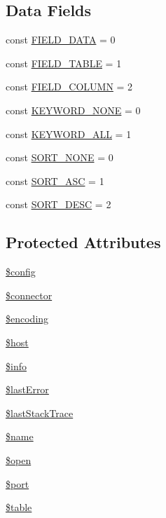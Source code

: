 \subsection*{Data Fields}
\begin{DoxyCompactItemize}
\item 
const \hyperlink{class_my_s_q_l_database_ac3188f4350978425c488580c5cea8468}{F\+I\+E\+L\+D\+\_\+\+D\+A\+T\+A} = 0
\item 
const \hyperlink{class_my_s_q_l_database_acbdf154a35cfc228dd1016e8aa4bd503}{F\+I\+E\+L\+D\+\_\+\+T\+A\+B\+L\+E} = 1
\item 
const \hyperlink{class_my_s_q_l_database_a87aad3e89cc6a17f293cf5410b225bbe}{F\+I\+E\+L\+D\+\_\+\+C\+O\+L\+U\+M\+N} = 2
\item 
const \hyperlink{class_my_s_q_l_database_a9b1a24ef01d468c146a71b333edb0c17}{K\+E\+Y\+W\+O\+R\+D\+\_\+\+N\+O\+N\+E} = 0
\item 
const \hyperlink{class_my_s_q_l_database_ababb5c4af464938f3f0b8f9c4fa183ba}{K\+E\+Y\+W\+O\+R\+D\+\_\+\+A\+L\+L} = 1
\item 
const \hyperlink{class_my_s_q_l_database_af3826c676cb54905f393f9d1f7ad48ea}{S\+O\+R\+T\+\_\+\+N\+O\+N\+E} = 0
\item 
const \hyperlink{class_my_s_q_l_database_a9517f2622dfc5fbb0cc64feef247eb06}{S\+O\+R\+T\+\_\+\+A\+S\+C} = 1
\item 
const \hyperlink{class_my_s_q_l_database_a0e633ab431ae1e5cc483a37cfe73bb09}{S\+O\+R\+T\+\_\+\+D\+E\+S\+C} = 2
\end{DoxyCompactItemize}
\subsection*{Protected Attributes}
\begin{DoxyCompactItemize}
\item 
\hyperlink{class_my_s_q_l_database_a49c7011be9c979d9174c52a8b83e5d8e}{\$config}
\item 
\hyperlink{class_my_s_q_l_database_a7c7a1968b87fd4d016e364b27b7a3d7d}{\$connector}
\item 
\hyperlink{class_my_s_q_l_database_aee271b7ce67fbe00b9976e6c347cbfbf}{\$encoding}
\item 
\hyperlink{class_my_s_q_l_database_a711797613cb863ca0756df789c396bf2}{\$host}
\item 
\hyperlink{class_my_s_q_l_database_ae19722790c6683980bbf0af8572f26ab}{\$info}
\item 
\hyperlink{class_my_s_q_l_database_a6cb6be70a528323568af007db6a3885e}{\$last\+Error}
\item 
\hyperlink{class_my_s_q_l_database_a12ff8f78a47e0fa691355a485c2e696a}{\$last\+Stack\+Trace}
\item 
\hyperlink{class_my_s_q_l_database_ab2fc40d43824ea3e1ce5d86dee0d763b}{\$name}
\item 
\hyperlink{class_my_s_q_l_database_a4269f690c0554ecb1deec21b80f321dc}{\$open}
\item 
\hyperlink{class_my_s_q_l_database_aa0787efab4b22e8a212882f3409d4c77}{\$port}
\item 
\hyperlink{class_my_s_q_l_database_ae8876a14058f368335baccf35af4a22b}{\$table}
\end{DoxyCompactItemize}


